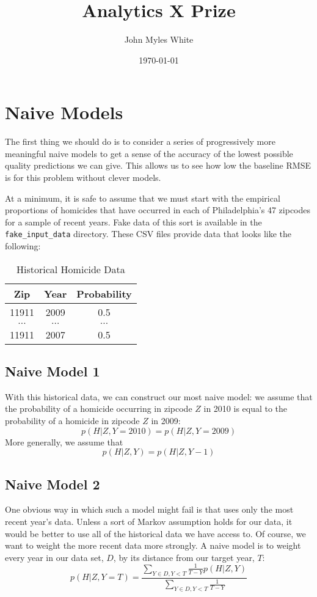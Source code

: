 \documentclass[11pt]{amsart}
\title{Analytics X Prize}
\author{John Myles White}
\date{\today}                                           %
\begin{document}
\maketitle

\section{Naive Models}
The first thing we should do is to consider a series of progressively more meaningful naive models to get a sense of the accuracy of the lowest possible quality predictions we can give. This allows us to see how low the baseline RMSE is for this problem without clever models.

At a minimum, it is safe to assume that we must start with the empirical proportions of homicides that have occurred in each of Philadelphia's 47 zipcodes for a sample of recent years. Fake data of this sort is available in the \verb|fake_input_data| directory. These CSV files provide data that looks like the following:
\begin{table}[htdp]
\caption{Historical Homicide Data}
\begin{center}
\begin{tabular}{|c|c|c|}
Zip & Year & Probability \\
\hline
11911 & 2009 & 0.5 \\
$\ldots$ & $\ldots$ & $\ldots$ \\
11911 & 2007 & 0.5 \\
\end{tabular}
\end{center}
\label{default}
\end{table}

\subsection{Naive Model 1}
With this historical data, we can construct our most naive model: we assume that the probability of a homicide occurring in zipcode $Z$ in 2010 is equal to the probability of a homicide in zipcode $Z$ in 2009:
\[
p(H | Z, Y = 2010) = p(H | Z, Y = 2009)
\]
More generally, we assume that
\[
p(H | Z, Y) = p(H | Z, Y -1)
\]

\subsection{Naive Model 2}
One obvious way in which such a model might fail is that uses only the most recent year's data. Unless a sort of Markov assumption holds for our data, it would be better to use all of the historical data we have access to. Of course, we want to weight the more recent data more strongly. A naive model is to weight every year in our data set, $D$, by its distance from our target year, $T$:
\[
p(H | Z, Y = T) = \frac{\sum_{Y \in D, Y < T} \frac{1}{T - Y} p(H | Z, Y)}{\sum_{Y \in D, Y < T} \frac{1}{T - Y}}
\]
\end{document}
